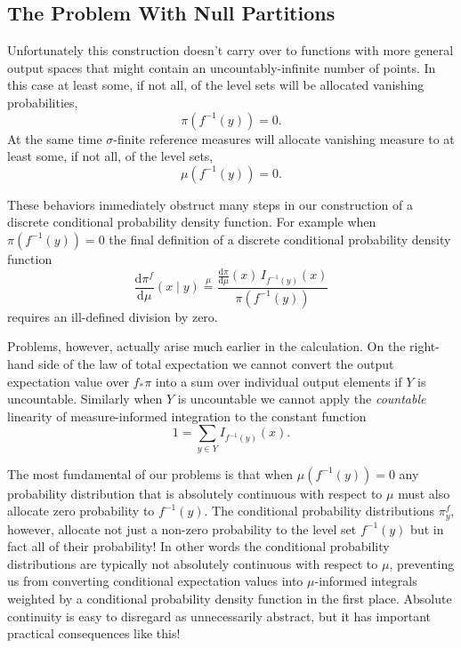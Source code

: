 \documentclass[
  letterpaper,
  DIV=11,
  numbers=noendperiod]{scrartcl}
\begin{document}
\subsection{The Problem With Null
Partitions}\label{the-problem-with-null-partitions}

Unfortunately this construction doesn't carry over to functions with
more general output spaces that might contain an uncountably-infinite
number of points. In this case at least some, if not all, of the level
sets will be allocated vanishing probabilities, \[
\pi( f^{-1}(y) ) = 0.
\] At the same time \(\sigma\)-finite reference measures will allocate
vanishing measure to at least some, if not all, of the level sets, \[
\mu( f^{-1}(y) ) = 0.
\]

These behaviors immediately obstruct many steps in our construction of a
discrete conditional probability density function. For example when
\(\pi( f^{-1}(y) ) = 0\) the final definition of a discrete conditional
probability density function \[
\frac{ \mathrm{d}  \pi^{f} }{ \mathrm{d}  \mu  }( x \mid y )
\overset{ \mu }{ = }
\frac{ \frac{ \mathrm{d}  \pi }{ \mathrm{d}  \mu  }(x) \, I_{f^{-1}(y)}(x) }{ \pi ( f^{-1}(y) ) }
\] requires an ill-defined division by zero.

Problems, however, actually arise much earlier in the calculation. On
the right-hand side of the law of total expectation we cannot convert
the output expectation value over \(f_{*} \pi\) into a sum over
individual output elements if \(Y\) is uncountable. Similarly when \(Y\)
is uncountable we cannot apply the \emph{countable} linearity of
measure-informed integration to the constant function \[
1 = \sum_{y \in Y} I_{f^{-1}(y)}(x).
\]

The most fundamental of our problems is that when \(\mu(f^{-1}(y)) = 0\)
any probability distribution that is absolutely continuous with respect
to \(\mu\) must also allocate zero probability to \(f^{-1}(y)\). The
conditional probability distributions \(\pi^{f}_{y}\), however, allocate
not just a non-zero probability to the level set \(f^{-1}(y)\) but in
fact all of their probability! In other words the conditional
probability distributions are typically not absolutely continuous with
respect to \(\mu\), preventing us from converting conditional
expectation values into \(\mu\)-informed integrals weighted by a
conditional probability density function in the first place. Absolute
continuity is easy to disregard as unnecessarily abstract, but it has
important practical consequences like this!
\end{document}
